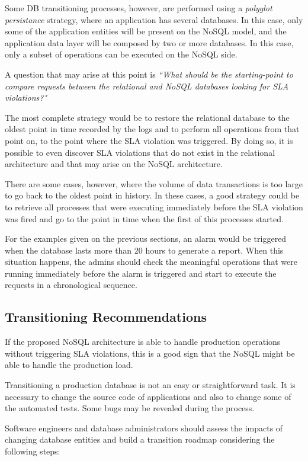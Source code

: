 Some DB transitioning processes, however, are performed using a \textit{polyglot persistance} strategy, where an application has several databases. In this case, only some of the application entities will be present on the NoSQL model, and the application data layer will be composed by two or more databases. In this case, only a subset of operations can be executed on the NoSQL side.

A question that may arise at this point is \textit{``What should be the starting-point to compare requests between the relational and NoSQL databases looking for SLA violations?"}

The most complete strategy would be to restore the relational database to the oldest point in time recorded by the logs and to perform all operations from that point on, to the point where the SLA violation was triggered. By doing so, it is possible to even discover SLA violations that do not exist in the relational architecture and that may arise on the NoSQL architecture.

There are some cases, however, where the volume of data transactions is too large to go back to the oldest point in history. In these cases, a good strategy could be to retrieve all processes that were executing immediately before the SLA violation was fired and go to the point in time when the first of this processes started. 

For the examples given on the previous sections, an alarm would be triggered when the database lasts more than 20 hours to generate a report. When this situation happens, the admins should check the meaningful operations that were running immediately before the alarm is triggered and start to execute the requests in a chronological sequence. 

\subsection{Transitioning Recommendations}
\label{transitioning-recommendations}
If the proposed NoSQL architecture is able to handle production operations without triggering SLA violations, this is a good sign that the NoSQL might be able to handle the production load.

Transitioning a production database is not an easy or straightforward task. It is necessary to change the source code of applications and also to change some of the automated tests. Some bugs may be revealed during the process. 

Software engineers and database administrators should assess the impacts of changing database entities and build a transition roadmap considering the following steps:

